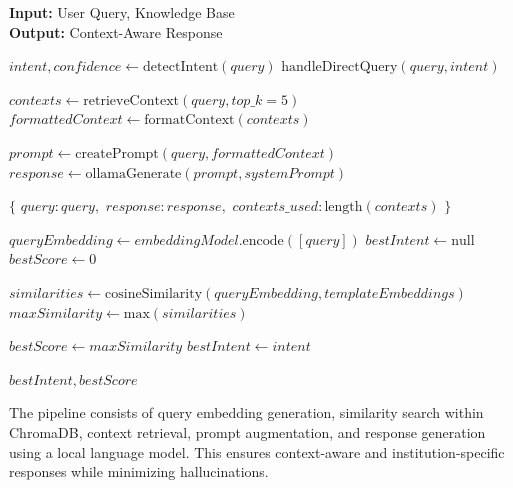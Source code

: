 \begin{algorithm}[H]
\caption{RAG Query Processing}
\label{alg:rag_processing}
\textbf{Input:} User Query, Knowledge Base\\
\textbf{Output:} Context-Aware Response
\begin{algorithmic}[1]
    \State $intent, confidence \gets \text{detectIntent}(query)$
        \State \Return $\text{handleDirectQuery}(query, intent)$
    \EndIf
    
    \State $contexts \gets \text{retrieveContext}(query, top\_k=5)$
    \State $formattedContext \gets \text{formatContext}(contexts)$
    
    \State $prompt \gets \text{createPrompt}(query, formattedContext)$
    \State $response \gets \text{ollamaGenerate}(prompt, systemPrompt)$
    
    \State \Return $\{$
    \State \hspace{1em} $query: query,$
    \State \hspace{1em} $response: response,$
    \State \hspace{1em} $contexts\_used: \text{length}(contexts)$
    \State $\}$
\EndFunction

    \State $queryEmbedding \gets embeddingModel.\text{encode}([query])$
    \State $bestIntent \gets \text{null}$
    \State $bestScore \gets 0$
    
        \State $similarities \gets \text{cosineSimilarity}(queryEmbedding, templateEmbeddings)$
        \State $maxSimilarity \gets \text{max}(similarities)$
        
            \State $bestScore \gets maxSimilarity$
            \State $bestIntent \gets intent$
        \EndIf
    \EndFor
    
    \State \Return $bestIntent, bestScore$
\EndFunction
\end{algorithmic}
\end{algorithm}

The pipeline consists of query embedding generation, similarity search within ChromaDB, context retrieval, prompt augmentation, and response generation using a local language model. This ensures context-aware and institution-specific responses while minimizing hallucinations.

